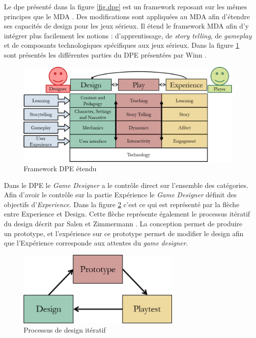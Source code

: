 Le \gls{dpe} présenté dans la figure \ref{fig.dpe} est un framework reposant sur les mêmes principes que le MDA . Des modifications sont appliquées au MDA afin d'étendre ses capacités de design pour les jeux sérieux. Il étend le framework MDA afin d'y intégrer plus facilement les notions : d'apprentissage, de  \emph{story telling}, de  \emph{gameplay} et de composants technologiques spécifiques aux jeux sérieux. Dans la figure \ref{fig.dpe_extended} sont présentés les différentes parties du DPE présentées par Winn \cite{Winn2011}.


\begin{figure}[H]
    \centering
    \includegraphics[width=14cm]{10_img/chap3/dpe_extended.png} 
    \caption{Framework DPE étendu \cite{Winn2011}}
    \label{fig.dpe_extended}
\end{figure}


Dans le DPE le \emph{Game Designer} a le contrôle direct sur l'ensemble des catégories. Afin d'avoir le contrôle sur la partie Expérience le \emph{Game Designer} définit des objectifs d'\emph{Experience}. Dans la figure \ref{fig.dpe_iteratif} c'est ce qui est représenté par la flèche entre Experience et Design. Cette flèche représente également le processus itératif du design décrit par Salen et Zimmermann \cite{Salen2013}. La conception permet de produire un prototype, et l'expérience sur ce prototype permet de modifier le design afin que l'Expérience corresponde aux attentes du \emph{game designer}.

\begin{figure}[H]
    \centering
    \includegraphics[width=8cm]{10_img/chap3/iteration_prototype.png} 
    \caption{Processus de design itératif \cite{Winn2011}}
    \label{fig.dpe_iteratif}
\end{figure}





